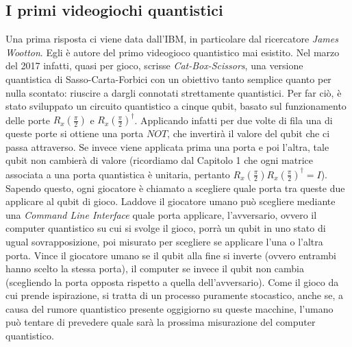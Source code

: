 \documentclass{book}
\theoremstyle{definition}
\theoremstyle{definition}
\theoremstyle{definition}
\theoremstyle{plain}
\theoremstyle{plain}
\theoremstyle{plain}
\theoremstyle{plain}
\begin{document}
\subsection{I primi videogiochi quantistici}
Una prima risposta ci viene data dall'IBM, in particolare dal ricercatore \emph{James Wootton}. Egli è autore del primo videogioco quantistico mai esistito. Nel marzo del 2017\cite{wootton_games_history} infatti, quasi per gioco, scrisse \emph{Cat-Box-Scissors}\cite{wootton_cat_box_scissor}, una versione quantistica di Sasso-Carta-Forbici con un obiettivo tanto semplice quanto per nulla scontato: riuscire a dargli connotati strettamente quantistici. Per far ciò, è stato sviluppato un circuito quantistico a cinque qubit, basato sul funzionamento delle porte $R_x(\frac{\pi}{2})$ e $R_x(\frac{\pi}{2})^{\dagger}$. Applicando infatti per due volte di fila una di queste porte si ottiene una porta $NOT$, che invertirà il valore del qubit che ci passa attraverso. Se invece viene applicata prima una porta e poi l'altra, tale qubit non cambierà di valore (ricordiamo dal Capitolo 1 che ogni matrice associata a una porta quantistica è unitaria, pertanto $R_x(\frac{\pi}{2}) R_x(\frac{\pi}{2})^{\dagger} = I$). Sapendo questo, ogni giocatore è chiamato a scegliere quale porta tra queste due applicare al qubit di gioco. Laddove il giocatore umano può scegliere mediante una \emph{Command Line Interface} quale porta applicare, l'avversario, ovvero il computer quantistico su cui si svolge il gioco, porrà un qubit in uno stato di ugual sovrapposizione, poi misurato per scegliere se applicare l'una o l'altra porta. Vince il giocatore umano se il qubit alla fine si inverte (ovvero entrambi hanno scelto la stessa porta), il computer se invece il qubit non cambia (scegliendo la porta opposta rispetto a quella dell'avversario). Come il gioco da cui prende ispirazione, si tratta di un processo puramente stocastico, anche se, a causa del rumore quantistico presente oggigiorno su queste macchine, l'umano può tentare di prevedere quale sarà la prossima misurazione del computer quantistico.
\end{document}
